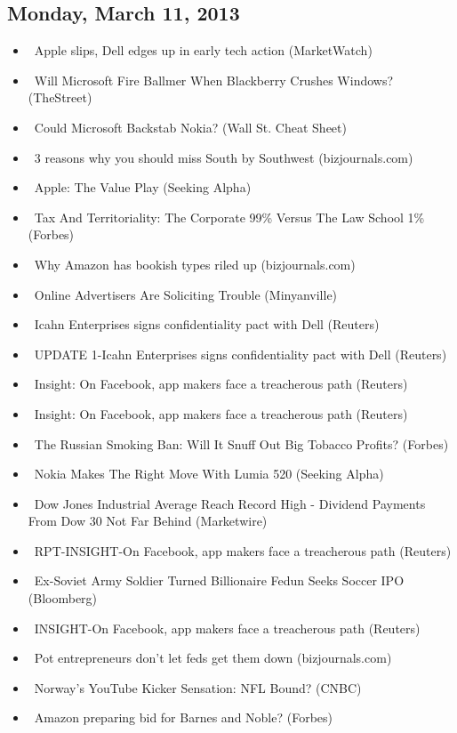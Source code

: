 \documentclass[11pt,asymmetric]{article}
\begin{document}
\subsection*{Monday, March 11, 2013}
\begin{itemize}
\item\ Apple slips, Dell edges up in early tech action (MarketWatch)
\item\ Will Microsoft Fire Ballmer When Blackberry Crushes Windows? (TheStreet)
\item\ Could Microsoft Backstab Nokia? (Wall St. Cheat Sheet)
\item\ 3 reasons why you should miss South by Southwest (bizjournals.com)
\item\ Apple: The Value Play (Seeking Alpha)
\item\ Tax And Territoriality: The Corporate 99\% Versus The Law School 1\% (Forbes)
\item\ Why Amazon has bookish types riled up (bizjournals.com)
\item\ Online Advertisers Are Soliciting Trouble (Minyanville)
\item\ Icahn Enterprises signs confidentiality pact with Dell (Reuters)
\item\ UPDATE 1-Icahn Enterprises signs confidentiality pact with Dell (Reuters)
\item\ Insight: On Facebook, app makers face a treacherous path (Reuters)
\item\ Insight: On Facebook, app makers face a treacherous path (Reuters)
\item\ The Russian Smoking Ban: Will It Snuff Out Big Tobacco Profits? (Forbes)
\item\ Nokia Makes The Right Move With Lumia 520 (Seeking Alpha)
\item\ Dow Jones Industrial Average Reach Record High - Dividend Payments From Dow 30 Not Far Behind (Marketwire)
\item\ RPT-INSIGHT-On Facebook, app makers face a treacherous path (Reuters)
\item\ Ex-Soviet Army Soldier Turned Billionaire Fedun Seeks Soccer IPO (Bloomberg)
\item\ INSIGHT-On Facebook, app makers face a treacherous path (Reuters)
\item\ Pot entrepreneurs don't let feds get them down (bizjournals.com)
\item\ Norway's YouTube Kicker Sensation: NFL Bound? (CNBC)
\item\ Amazon preparing bid for Barnes and Noble? (Forbes)

\end{itemize}
\end{document}
